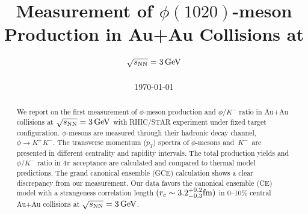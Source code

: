 \documentclass[%
 reprint,	
showpacs,
 amsmath,amssymb,
 aps,
 prc,
]{revtex4-1}
\begin{document}

\title{Measurement of $\phi(1020)$-meson Production in Au+Au Collisions at ${\sqrt{s_{\rm NN}} = \rm{3\,GeV}}$}%


\noaffiliation

\date{\today}%

\begin{abstract}


We report on the first measurement of $\phi$-meson production and $\phi/K^-$ ratio in Au+Au collisions at ${\sqrt{s_{\rm NN}} = \rm{3\,GeV}}$ with RHIC/STAR experiment under fixed target configuration. $\phi$-mesons are measured through their hadronic decay channel, $\phi\rightarrow K^+K^-$. The transverse momentum ($p_T$) spectra of $\phi$-mesons and $K^-$ are presented in different centrality and rapidity intervals. The total production yields and $\phi/K^-$ ratio in $4\pi$ acceptance are calculated and compared to thermal model predictions. The grand canonical ensemble (GCE) calculation shows a clear discrepancy from our measurement. Our data favors the canonical ensemble (CE) model with a strangeness correlation length $(r_c   \sim 3.2_{-0.3}^{+0.2} \rm{fm})$ in 0--10\% central Au+Au collisions at ${\sqrt{s_{\rm NN}} = \rm{3\,GeV}}$.


\end{abstract}
\end{document}
